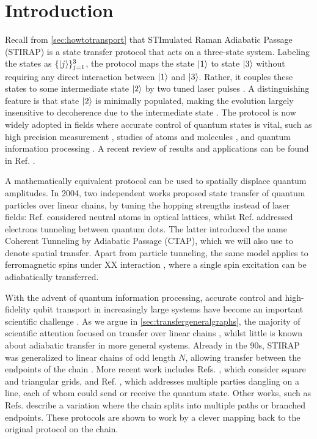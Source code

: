 

\section{Introduction}
Recall from \cref{sec:howtotransport} that STImulated Raman Adiabatic Passage (STIRAP) is a state transfer protocol that acts on a three-state system. Labeling the states as $\{ \lvert j\rangle \}_{j=1}^3$, the protocol maps the state $\lvert1\rangle$ to state $\lvert3\rangle$ without requiring any direct interaction between $\lvert1\rangle$ and $\lvert3\rangle$. Rather, it couples these states to some intermediate state $\lvert2\rangle$ by two tuned laser pulses \cite{Gaubatz1990}. A distinguishing feature is that state $\lvert2\rangle$ is minimally populated, making the evolution largely insensitive to decoherence due to the intermediate state \cite{Vitanov2017}. The protocol is now widely adopted in fields where accurate control of quantum states is vital, such as high precision measurement \cite{Kasevich2002,Kotru2015}, studies of atoms and molecules \cite{Kral2007,Stellmer2012,Petrosyan2015,Moses2017,Ciamei2017}, and quantum information processing \cite{Pachos2002,Troiani2003,Paspalakis2004,Timoney2011,Koh2013}. A recent review of results and applications can be found in Ref. \cite{Vitanov2017}. 

A mathematically equivalent protocol can be used to spatially displace quantum amplitudes. In 2004, two independent works proposed state transfer of quantum particles over linear chains, by tuning the hopping strengths instead of laser fields: Ref. \cite{Eckert2004} considered neutral atoms in optical lattices, whilst Ref. \cite{Greentree2004} addressed electrons tunneling between quantum dots. The latter introduced the name Coherent Tunneling by Adiabatic Passage (CTAP), which we will also use to denote spatial transfer. Apart from particle tunneling, the same model applies to ferromagnetic spins under XX interaction \cite{Ohshima2007}, where a single spin excitation can be adiabatically transferred. 

%
%

With the advent of quantum information processing, accurate control and high-fidelity qubit transport in increasingly large systems have become an important scientific challenge \cite{DiVincenzo2000,Preskill2018}.  As we argue in \cref{sec:transfergeneralgraphs}, the majority of scientific attention focused on transfer over linear chains \cite{Vitanov2017, Menchon-Enrich2016}, whilst little is known about adiabatic transfer in more general systems. Already in the 90s, STIRAP was generalized to linear chains of odd length $N$, allowing transfer between the endpoints of the chain \cite{Malinovsky1997}. More recent work includes Refs. \cite{Bradly2012,Longhi2014}, which consider square and triangular grids, and Ref. \cite{Greentree2006}, which addresses multiple parties dangling on a line, each of whom could send or receive the quantum state. Other works, such as Refs. \cite{Chen2013,Batey2015} describe a variation where the chain splits into multiple paths or branched endpoints. These protocols are shown to work by a clever mapping back to the original protocol on the chain.  

